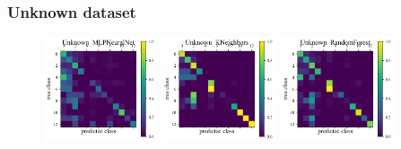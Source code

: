 
\subsubsection{Unknown dataset}
\label{sec:mystery}

\begin{figure}
	\begin{center}
		\includegraphics[width=0.3\textwidth]{./fig/Unknown_MLPNeuralNet_cm.png}
		\includegraphics[width=0.3\textwidth]{./fig/Unknown_KNeighbors_cm.png}
		\includegraphics[width=0.3\textwidth]{./fig/Unknown_RandomForest_cm.png}
		\caption{}
		\label{fig:unknown_cm}
	\end{center}
\end{figure}
